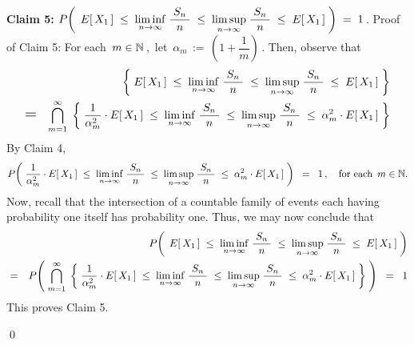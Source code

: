 \begin{enumerate}
\vskip 0.8cm
\noindent
\textbf{Claim 5:}\quad\quad
$P\!\left(\;\,
	E[\,X_{1}\,]
	\;\leq\;
		\underset{n\rightarrow\infty}{\liminf}\;
		\dfrac{{\color{white}.}S_{n}{\color{white}.}}{n}
	\;\leq\;
		\underset{n\rightarrow\infty}{\limsup}\;
		\dfrac{{\color{white}.}S_{n}{\color{white}.}}{n}
	\;\leq\;
		E[\,X_{1}\,]
	\;\right)
\;=\;1$\,.
\vskip 0.3cm
\noindent
Proof of Claim 5:\quad
For each \,$m \in \mathbb{N}$\,,\, let \,$\alpha_{m} \,:=\, \left(1 + \dfrac{1}{m}\right)$\,.
Then, observe that
\begin{eqnarray*}
&&
	\left\{\;
		E[\,X_{1}\,]
		\;\leq\;
			\underset{n\rightarrow\infty}{\liminf}\;
			\dfrac{{\color{white}.}S_{n}{\color{white}.}}{n}
		\;\leq\;
			\underset{n\rightarrow\infty}{\limsup}\;
			\dfrac{{\color{white}.}S_{n}{\color{white}.}}{n}
		\;\leq\;
			E[\,X_{1}\,]
		\;\right\}
\\
& \textnormal{\Large$=$} &
	\overset{\infty}{\underset{m=1}{\bigcap}}\;
	\left\{\;
		\dfrac{1}{\alpha_{m}^{2}} \cdot E[\,X_{1}\,]
		\;\leq\;
			\underset{n\rightarrow\infty}{\liminf}\;
			\dfrac{{\color{white}.}S_{n}{\color{white}.}}{n}
		\;\leq\;
			\underset{n\rightarrow\infty}{\limsup}\;
			\dfrac{{\color{white}.}S_{n}{\color{white}.}}{n}
		\;\leq\;
			\alpha_{m}^{2} \cdot E[\,X_{1}\,]
		\;\right\}
\end{eqnarray*}
By Claim 4,
\begin{equation*}
P\!\left(\;
	\dfrac{1}{\alpha_{m}^{2}} \cdot E[\,X_{1}\,]
	\;\leq\;
		\underset{n\rightarrow\infty}{\liminf}\;
		\dfrac{{\color{white}.}S_{n}{\color{white}.}}{n}
	\;\leq\;
		\underset{n\rightarrow\infty}{\limsup}\;
		\dfrac{{\color{white}.}S_{n}{\color{white}.}}{n}
	\;\leq\;
		\alpha_{m}^{2} \cdot E[\,X_{1}\,]
	\;\right)
\;\; = \;\;
	1\,,
\quad
\textnormal{for each \,$m \in \N$}.
\end{equation*}
Now, recall that the intersection of a countable family of events each having probability one itself has probability one.
Thus, we may now conclude that
\begin{eqnarray*}
&&
	P\!\left(\;\,
		E[\,X_{1}\,]
		\;\leq\;
			\underset{n\rightarrow\infty}{\liminf}\;
			\dfrac{{\color{white}.}S_{n}{\color{white}.}}{n}
		\;\leq\;
			\underset{n\rightarrow\infty}{\limsup}\;
			\dfrac{{\color{white}.}S_{n}{\color{white}.}}{n}
		\;\leq\;
			E[\,X_{1}\,]
		\;\right)
\\
& = &
	P\!\left(\;
		\overset{\infty}{\underset{m=1}{\bigcap}}\;
		\left\{\;
			\dfrac{1}{\alpha_{m}^{2}} \cdot E[\,X_{1}\,]
			\;\leq\;
				\underset{n\rightarrow\infty}{\liminf}\;
				\dfrac{{\color{white}.}S_{n}{\color{white}.}}{n}
			\;\leq\;
				\underset{n\rightarrow\infty}{\limsup}\;
				\dfrac{{\color{white}.}S_{n}{\color{white}.}}{n}
			\;\leq\;
				\alpha_{m}^{2} \cdot E[\,X_{1}\,]
			\;\right\}
		\;\right)
\;\; = \;\;
	1
\end{eqnarray*}
This proves Claim 5.
\end{enumerate}

\qed

\renewcommand{\theenumi}{\roman{enumi}}
\renewcommand{\labelenumi}{\textnormal{(\theenumi)}$\;\;$}

